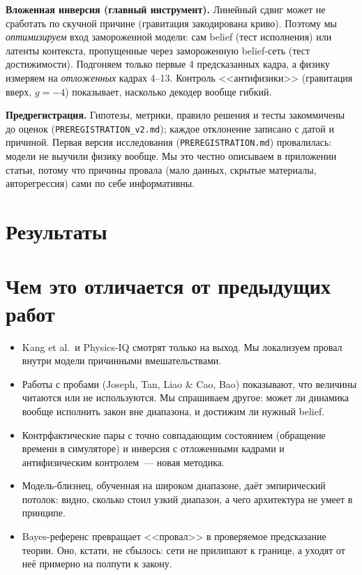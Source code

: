 \documentclass[11pt]{article}
\begin{document}
\textbf{Вложенная инверсия (главный инструмент).} Линейный сдвиг может не сработать по скучной
причине (гравитация закодирована криво). Поэтому мы \emph{оптимизируем} вход замороженной модели:
сам belief (тест исполнения) или латенты контекста, пропущенные через замороженную belief-сеть
(тест достижимости). Подгоняем только первые 4 предсказанных кадра, а физику измеряем на
\emph{отложенных} кадрах 4--13. Контроль <<антифизики>> (гравитация вверх, $g=-4$) показывает,
насколько декодер вообще гибкий.

\textbf{Предрегистрация.} Гипотезы, метрики, правило решения и тесты закоммичены до оценок
(\texttt{PREREGISTRATION\_v2.md}); каждое отклонение записано с датой и причиной. Первая версия
исследования (\texttt{PREREGISTRATION.md}) провалилась: модели не выучили физику вообще. Мы это
честно описываем в приложении статьи, потому что причины провала (мало данных, скрытые материалы,
авторегрессия) сами по себе информативны.

\section{Результаты}
\label{sec:results}

\OverviewResults

\section{Чем это отличается от предыдущих работ}

\begin{itemize}
\item Kang et al.\ и Physics-IQ смотрят только на выход. Мы локализуем провал внутри модели
причинными вмешательствами.
\item Работы с пробами (Joseph, Tan, Liao \& Cao, Bao) показывают, что величины читаются или не
используются. Мы спрашиваем другое: может ли динамика вообще исполнить закон вне диапазона, и
достижим ли нужный belief.
\item Контрфактические пары с точно совпадающим состоянием (обращение времени в симуляторе) и
инверсия с отложенными кадрами и антифизическим контролем~--- новая методика.
\item Модель-близнец, обученная на широком диапазоне, даёт эмпирический потолок: видно, сколько стоил
узкий диапазон, а чего архитектура не умеет в принципе.
\item Bayes-референс превращает <<провал>> в проверяемое предсказание теории. Оно, кстати, не сбылось:
сети не прилипают к границе, а уходят от неё примерно на полпути к закону.
\end{itemize}
\end{document}

